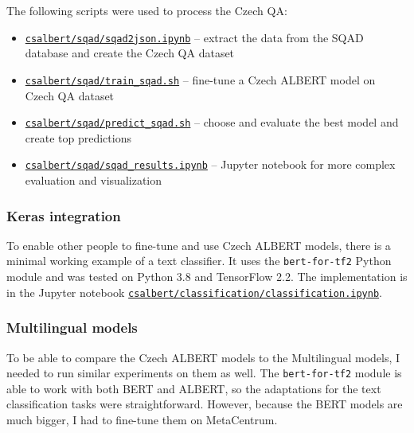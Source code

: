 \documentclass[
  printed, %
  color,   %
  table,   %
  oneside, %
  lof,     %
  lot,     %
]{fithesis3}
\begin{document}
\vspace{1em}
{\parindent=0pt
The following scripts were used to process the Czech QA: 
\begin{itemize}
    \setlength{\itemsep}{0.1em}
    
\item \href{https://github.com/ZepZep/csalbert/blob/master/sqad/sqad2json.ipynb}
    {\texttt{csalbert/sqad/sqad2json.ipynb}} 
    -- extract the data from the SQAD database and create the Czech QA dataset

\item \href{https://github.com/ZepZep/csalbert/blob/master/sqad/train_sqad.sh}
    {\texttt{csalbert/sqad/train\_sqad.sh}}
    -- fine-tune a Czech ALBERT model on Czech QA dataset

\item \href{https://github.com/ZepZep/csalbert/blob/master/sqad/train_sqad.sh}
    {\texttt{csalbert/sqad/predict\_sqad.sh}}
    -- choose and evaluate the best model and create top predictions
    
\item \href{https://github.com/ZepZep/csalbert/blob/master/sqad/sqad_results.ipynb}
    {\texttt{csalbert/sqad/sqad\_results.ipynb}}
    -- Jupyter notebook for more complex evaluation and visualization

\end{itemize}
}

\subsubsection{Keras integration}
To enable other people to fine-tune and use Czech ALBERT models, there is a minimal working example of a text classifier. It uses the \texttt{bert-for-tf2} Python module and was tested on Python 3.8 and TensorFlow 2.2. The implementation is in the Jupyter notebook \newline
\href{https://github.com/ZepZep/csalbert/blob/master/classification/classification.ipynb}{\texttt{csalbert/classification/classification.ipynb}}.

\subsubsection{Multilingual models}
To be able to compare the Czech ALBERT models to the Multilingual models, I needed to run similar experiments on them as well. The \texttt{bert-for-tf2} module is able to work with both BERT and ALBERT, so the adaptations for the text classification tasks were straightforward. However, because the BERT models are much bigger, I had to fine-tune them on MetaCentrum.
\end{document}
